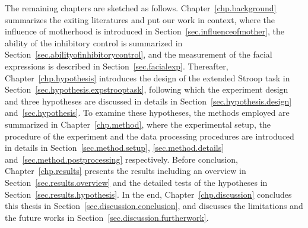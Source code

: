 The remaining chapters are sketched as follows.
Chapter~\ref{chp.background} summarizes the exiting literatures
and put our work in context,
where
the influence of motherhood is introduced in Section~\ref{sec.influenceofmother},
the ability of the inhibitory control is summarized in Section~\ref{sec.abilityofinhibitorycontrol},
and the measurement of the facial expressions 
is described in Section~\ref{sec.facialexp}. 
Thereafter,
Chapter~\ref{chp.hypothesis} 
introduces the design of the extended Stroop task in Section~\ref{sec.hypothesis.expstrooptask}, 
following which the 
experiment design and three hypotheses are discussed in details in Section~\ref{sec.hypothesis.design} and~\ref{sec.hypothesis}. 
To examine these hypotheses, 
the methods employed are summarized in 
Chapter~\ref{chp.method},
where the experimental setup, the procedure of the experiment 
and the data processing procedures are introduced in details 
in Section~\ref{sec.method.setup}, \ref{sec.method.details} and~\ref{sec.method.postprocessing} respectively. 
Before conclusion,
Chapter~\ref{chp.results} presents the results including an overview in Section~\ref{sec.results.overview} and the detailed tests of the hypotheses in Section~\ref{sec.results.hypothesis}.
In the end,
Chapter~\ref{chp.discussion} concludes 
this thesis in Section~\ref{sec.discussion.conclusion},
and discusses the limitations and the future works
in Section~\ref{sec.discussion.furtherwork}.




















